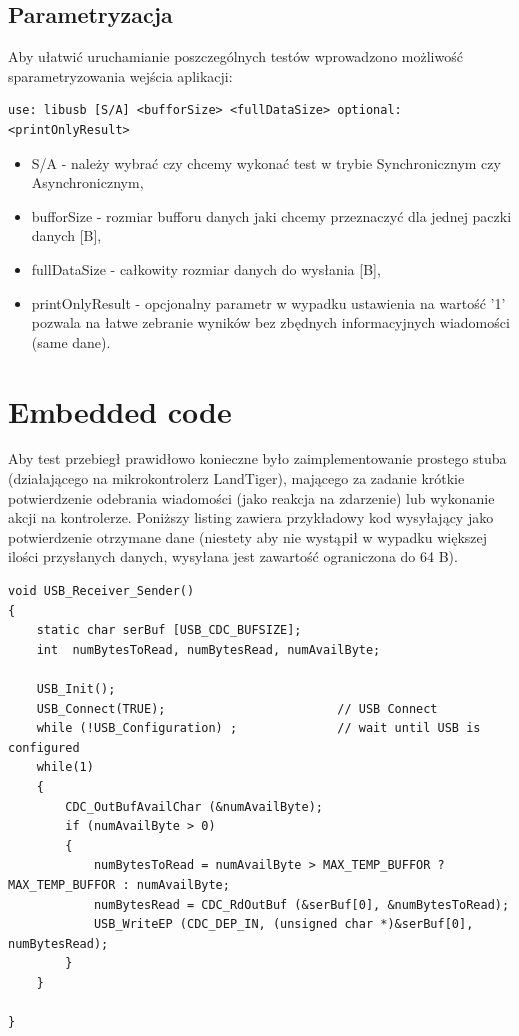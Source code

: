\documentclass{BscUS}
\begin{document}
\subsection{Parametryzacja}
\noindent Aby ułatwić uruchamianie poszczególnych testów wprowadzono możliwość sparametryzowania wejścia aplikacji:
\begin{lstlisting}[caption={uruchomienie testu}]
use: libusb [S/A] <bufforSize> <fullDataSize> optional:<printOnlyResult>
\end{lstlisting}
\begin{itemize}
\item S/A - należy wybrać czy chcemy wykonać test w trybie Synchronicznym czy Asynchronicznym,
\item bufforSize - rozmiar bufforu danych jaki chcemy przeznaczyć dla jednej paczki danych [B],
\item fullDataSize - całkowity rozmiar danych do wysłania [B],
\item printOnlyResult - opcjonalny parametr w wypadku ustawienia na wartość '1' pozwala na łatwe zebranie wyników bez zbędnych informacyjnych wiadomości (same dane). 
\end{itemize}
\section{Embedded code}
Aby test przebiegł prawidłowo konieczne było zaimplementowanie prostego stuba (działającego na mikrokontrolerz LandTiger), mającego za zadanie krótkie potwierdzenie odebrania wiadomości (jako reakcja na zdarzenie) lub wykonanie akcji na kontrolerze. Poniższy listing zawiera przykładowy kod wysyłający jako potwierdzenie otrzymane dane (niestety aby nie wystąpił w wypadku większej ilości przysłanych danych, wysyłana jest zawartość ograniczona do 64 B). \cite{embeddedC, embeddedSystems, bootstrapLinUSB}
\begin{lstlisting}[caption={Funkcja USB\_Receiver\_Sender},label={lst:FUSBSenderReceiver}]
void USB_Receiver_Sender()
{
	static char serBuf [USB_CDC_BUFSIZE];
	int  numBytesToRead, numBytesRead, numAvailByte;

	USB_Init();
	USB_Connect(TRUE);                        // USB Connect
	while (!USB_Configuration) ;              // wait until USB is configured
	while(1)
	{
		CDC_OutBufAvailChar (&numAvailByte);
		if (numAvailByte > 0)
		{
		  	numBytesToRead = numAvailByte > MAX_TEMP_BUFFOR ? MAX_TEMP_BUFFOR : numAvailByte;
		    numBytesRead = CDC_RdOutBuf (&serBuf[0], &numBytesToRead);
		    USB_WriteEP (CDC_DEP_IN, (unsigned char *)&serBuf[0], numBytesRead);
		}
	}

}
\end{lstlisting}
\end{document}

